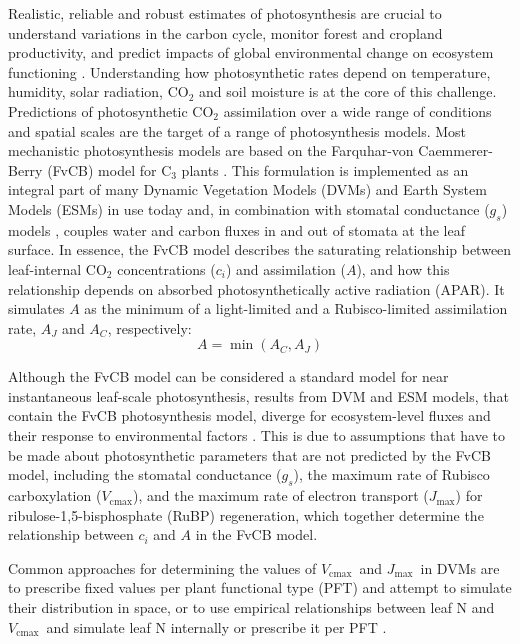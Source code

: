 \documentclass[gmd, manuscript]{copernicus}
\newcommand{\vcmax}{$V_{\text{cmax}}$}
\newcommand{\jmax}{$J_{\text{max}}$}
\begin{document}
\introduction  %
Realistic, reliable and robust estimates of photosynthesis are crucial to understand variations in the carbon cycle, monitor forest and cropland productivity, and predict impacts of global environmental change on ecosystem functioning \citep{prentice15}. Understanding how photosynthetic rates depend on temperature, humidity, solar radiation, CO$_2$ and soil moisture is at the core of this challenge. Predictions of photosynthetic CO$_2$ assimilation over a wide range of conditions and spatial scales are the target of a range of photosynthesis models. Most mechanistic photosynthesis models are based on the Farquhar-von Caemmerer-Berry (FvCB) model for C$_3$ plants \citep{farquhar80, voncaemmerer81}. This formulation is implemented as an integral part of many Dynamic Vegetation Models (DVMs) and Earth System Models (ESMs) in use today \citep{rogers17} and, in combination with stomatal conductance ($g_s$) models \citep{ball87, leuning95pce, medlyn11gcb}, couples water and carbon fluxes in and out of stomata at the leaf surface. In essence, the FvCB model describes the saturating relationship between leaf-internal CO$_2$ concentrations ($c_i$) and assimilation ($A$), and how this relationship depends on absorbed photosynthetically active radiation (APAR). It simulates $A$ as the minimum of a light-limited and a Rubisco-limited assimilation rate, $A_J$ and $A_C$, respectively:
\begin{equation}
    A = \min(A_C, A_J)
\end{equation}

Although the FvCB model can be considered a standard model for near instantaneous leaf-scale photosynthesis, results from DVM and ESM models, that contain the FvCB photosynthesis model, diverge for ecosystem-level fluxes and their response to environmental factors \citep{rogers17}. This is due to assumptions that have to be made about photosynthetic parameters that are not predicted by the FvCB model, including the stomatal conductance ($g_s$), the maximum rate of Rubisco carboxylation (\vcmax ), and the maximum rate of electron transport (\jmax ) for ribulose-1,5-bisphosphate (RuBP) regeneration, which together determine the relationship between $c_i$ and $A$ in the FvCB model. 

Common approaches for determining the values of \vcmax\ and \jmax\ in DVMs are to prescribe fixed values per plant functional type (PFT) and attempt to simulate their distribution in space, or to use empirical relationships between leaf N and \vcmax\ and simulate leaf N internally or prescribe it per PFT \citep{smithdukes13gcb, rogers14}. 
\end{document}
